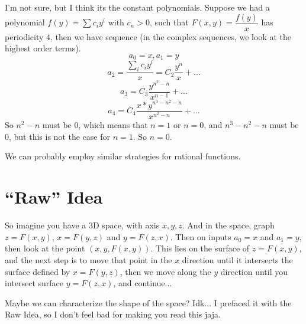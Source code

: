 \documentclass[12pt]{article}
\begin{document}
I'm not sure, but I think its the constant polynomials. Suppose we had a polynomial $f(y) = \sum c_iy^i$ with $c_n > 0$, such that $F(x,y) = \dfrac{f(y)}{x}$ has periodicity $4$, then we have sequence (in the complex sequences, we look at the highest order terms).
\[ a_0 = x, a_1 = y \]
\[ a_2 = \dfrac{\sum_i c_i y^i}{x} = C_2\frac{y^n}{x} + ... \]
\[ a_3 = C_3 \frac{y^{n^2-n}}{x^{n-1}} + ...\]
\[ a_4 = C_4 \dfrac{x*y^{n^3-n^2-n}}{x^{n^2 - n}} + ...\]
So $n^2 - n$ must be 0, which means that $n = 1$ or $n=0$, and $n^3 - n^2 - n$ must be 0, but this is not the case for $n = 1$. So $n=0$. 

We can probably employ similar strategies for rational functions.
\section{``Raw'' Idea}

So imagine you have a 3D space, with axis $x,y,z$. And in the space, graph $z = F(x,y)$, $x = F(y,z)$ and $y = F(z,x)$. Then on inputs $a_0 = x$ and $a_1 = y$, then look at the point $(x,y, F(x,y))$. This lies on the surface of $z = F(x,y)$, and the next step is to move that point in the $x$ direction until it intersects the surface defined by $x = F(y,z)$, then we move along the $y$ direction until you intersect surface $y = F(z,x)$, and continue...

Maybe we can characterize the shape of the space? Idk... I prefaced it with the Raw Idea, so I don't feel bad for making you read this jaja. 
\end{document}
